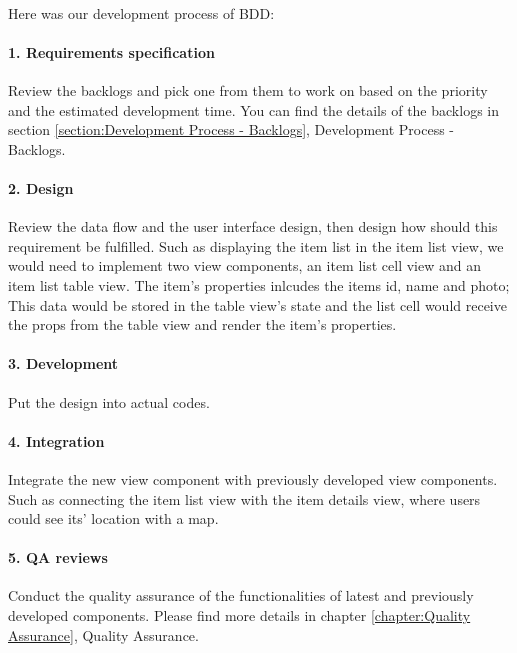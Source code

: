 \documentclass[12pt,a4paper]{article}
\begin{document}
          \paragraph{}Here was our development process of BDD:
          
          \paragraph{1. Requirements specification} Review the backlogs and pick one from them to work on based on the priority and the estimated development time. You can find the details of the backlogs in section \ref{section:Development Process - Backlogs}, Development Process - Backlogs.
          
          \paragraph{2. Design} Review the data flow and the user interface design, then design how should this requirement be fulfilled. Such as displaying the item list in the item list view, we would need to implement two view components, an item list cell view and an item list table view. The item's properties inlcudes the items id, name and photo; This data would be stored in the table view's state and the list cell would receive the props from the table view and render the item's properties.
          
          \paragraph{3. Development}Put the design into actual codes.
          
          \paragraph{4. Integration}Integrate the new view component with previously developed view components. Such as connecting the item list view with the item details view, where users could see its' location with a map.
          
          \paragraph{5. QA reviews}Conduct the quality assurance of the functionalities of latest and previously developed components. Please find more details in chapter \ref{chapter:Quality Assurance}, Quality Assurance.
          
\end{document}
